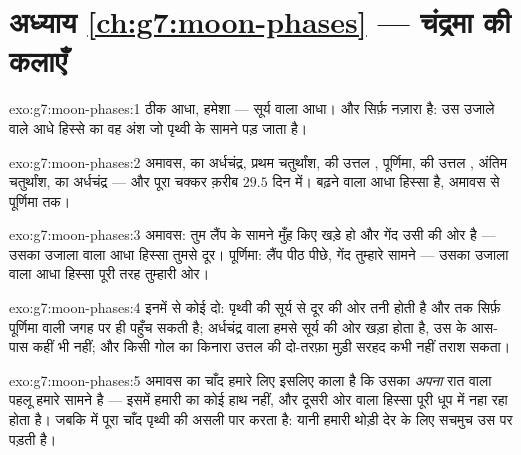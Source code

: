 \section*{अध्याय \ref{ch:g7:moon-phases} --- चंद्रमा की कलाएँ}

\begin{solution}{exo:g7:moon-phases:1}
ठीक आधा, हमेशा --- सूर्य वाला आधा। और  सिर्फ़ नज़ारा है: उस उजाले
वाले आधे हिस्से का वह अंश जो पृथ्वी के सामने पड़ जाता है।
\end{solution}

\begin{solution}{exo:g7:moon-phases:2}
अमावस,  का अर्धचंद्र, प्रथम चतुर्थांश,  की उत्तल
, पूर्णिमा,  की उत्तल , अंतिम चतुर्थांश, 
का अर्धचंद्र --- और पूरा चक्कर क़रीब $29.5$ दिन में।  बढ़ने
वाला आधा हिस्सा है, अमावस से पूर्णिमा तक।
\end{solution}

\begin{solution}{exo:g7:moon-phases:3}
अमावस: तुम लैंप के सामने मुँह किए खड़े हो और गेंद उसी की ओर है ---
उसका उजाला वाला आधा हिस्सा तुमसे दूर। पूर्णिमा: लैंप पीठ पीछे, गेंद
तुम्हारे सामने --- उसका उजाला वाला आधा हिस्सा पूरी तरह तुम्हारी ओर।
\end{solution}

\begin{solution}{exo:g7:moon-phases:4}
इनमें से कोई दो: पृथ्वी की  सूर्य से दूर की ओर तनी होती है और
 तक सिर्फ़ पूर्णिमा वाली जगह पर ही पहुँच सकती है; अर्धचंद्र
वाला  हमसे सूर्य की ओर खड़ा होता है, उस  के आस-पास कहीं भी
नहीं; और किसी गोल  का किनारा उत्तल  की दो-तरफ़ा मुड़ी सरहद
कभी नहीं तराश सकता।
\end{solution}

\begin{solution}{exo:g7:moon-phases:5}
अमावस का चाँद हमारे लिए इसलिए काला है कि उसका \emph{अपना} रात वाला
पहलू हमारे सामने है --- इसमें हमारी  का कोई हाथ नहीं, और दूसरी ओर
वाला हिस्सा पूरी धूप में नहा रहा होता है। जबकि  में पूरा
चाँद पृथ्वी की असली  पार करता है: यानी हमारी  थोड़ी देर
के लिए सचमुच उस पर पड़ती है।
\end{solution}

